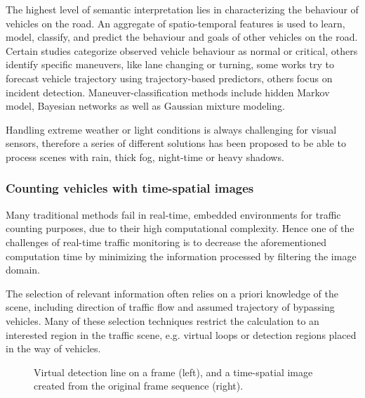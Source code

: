 The highest level of semantic interpretation lies in characterizing the behaviour of vehicles on the road\cite{Sivaraman2013}.
An aggregate of spatio-temporal features is used to learn, model, classify, and predict the behaviour and goals of other vehicles on the road.
Certain studies categorize observed vehicle behaviour as normal or critical\cite{Cherng2009}, others identify specific maneuvers, like lane changing or turning\cite{Garcia2012}, some works try to forecast vehicle trajectory using trajectory-based predictors\cite{Hermes2009}, others focus on incident detection\cite{Kamijo2004}.
Maneuver-classification methods include hidden Markov model\cite{Sivaraman2011}, Bayesian networks\cite{Kasper2012} as well as Gaussian mixture modeling\cite{Wiest2012}.

Handling extreme weather or light conditions is always challenging for visual sensors, therefore a series of different solutions has been proposed to be able to process scenes with rain\cite{Yu2015,Barnum2010}, thick fog\cite{Zhou2014a,Tarel2009}, night-time\cite{Bi2009, Robert2009} or heavy shadows\cite{Kamkar2016, Miller2015}.

\subsubsection{Counting vehicles with time-spatial images}
Many traditional methods fail in real-time, embedded environments for traffic counting purposes, due to their high computational complexity.
Hence one of the challenges of real-time traffic monitoring is to decrease the aforementioned computation time by minimizing the information processed by filtering the image domain.

The selection of relevant information often relies on a priori knowledge of the scene, including direction of traffic flow and assumed trajectory of bypassing vehicles.
Many of these selection techniques restrict the calculation to an interested region in the traffic scene, e.g. virtual loops\cite{Tursun2013a, He2008} or detection regions\cite{Miller2015, Engel2016} placed in the way of vehicles.

\begin{figure}[!h]
	\centering
	
	\caption{Virtual detection line on a frame (left), and a time-spatial image created from the original frame sequence (right).\label{fig:TSI}}
\end{figure}

